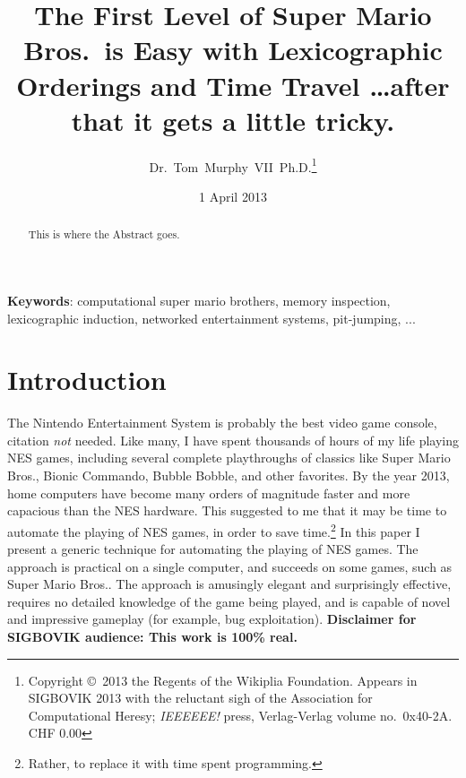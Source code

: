 \documentclass[twocolumn]{article}
\begin{document}
 

\title{The First Level of Super Mario Bros.~is Easy with Lexicographic Orderings and Time Travel
       {\normalsize \ldots after that it gets a little tricky.}}
\author{Dr.~Tom~Murphy~VII~Ph.D.\thanks{
Copyright \copyright\ 2013 the Regents of the Wikiplia
Foundation. Appears in SIGBOVIK 2013 with the reluctant sigh of the
Association for Computational Heresy; {\em IEEEEEE!} press,
Verlag-Verlag volume no.~0x40-2A.
CHF 0.00}
}


\renewcommand\>{$>$}
\newcommand\<{$<$}

\date{1 April 2013}

\maketitle

\begin{abstract}
This is where the Abstract goes.
\end{abstract}

\vspace{1em}
{\noindent \small {\bf Keywords}:
  computational super mario brothers, memory inspection, lexicographic induction, networked entertainment systems, pit-jumping, ...

}

\section*{Introduction}
The Nintendo Entertainment System is probably the best video game console, citation {\it not} needed. Like many, I have spent thousands of hours of my life playing NES games, including several complete playthroughs of classics like Super Mario Bros., Bionic Commando, Bubble Bobble, and other favorites. By the year 2013, home computers have become many orders of magnitude faster and more capacious than the NES hardware. This suggested to me that it may be time to automate the playing of NES games, in order to save time.\footnote{Rather, to replace it with time spent programming.} In this paper I present a generic technique for automating the playing of NES games. The approach is practical on a single computer, and succeeds on some games, such as Super Mario Bros.. The approach is amusingly elegant and surprisingly effective, requires no detailed knowledge of the game being played, and is capable of novel and impressive gameplay (for example, bug exploitation). {\bf Disclaimer for SIGBOVIK audience: This work is 100\% real.}
\end{document}

